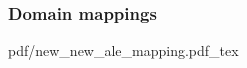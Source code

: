 \begin{frame}
  \frametitle{Domain mappings}

  \begin{center}
    \def\svgwidth{0.8\textwidth}
    {pdf/new_new_ale_mapping.pdf_tex}
  \end{center}

\end{frame}
